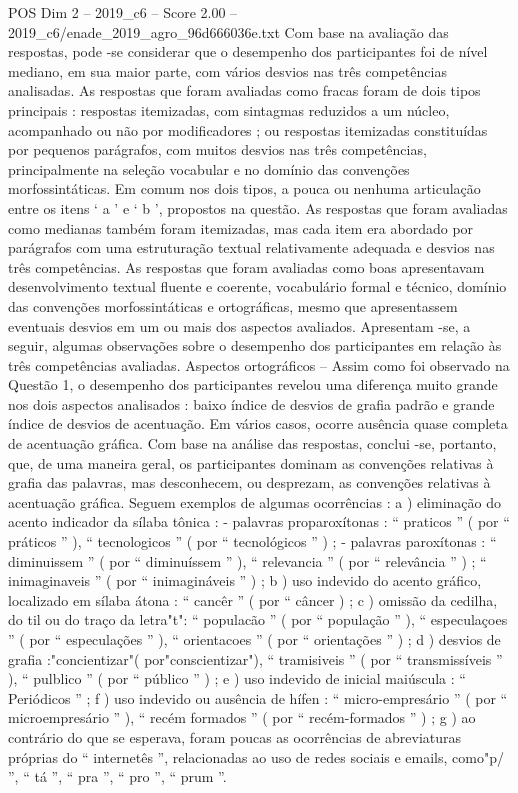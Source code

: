 \begin{textsample}{POS Dim 2 – 2019\_c6 – Score 2.00 – 2019\_c6/enade\_2019\_agro\_96d666036e.txt}
Com base na avaliação das respostas, pode -se considerar que o desempenho dos participantes foi de nível mediano, em sua maior parte, com vários desvios nas três competências analisadas.
As respostas que foram avaliadas como fracas foram de dois tipos principais : respostas itemizadas, com sintagmas reduzidos a um núcleo, acompanhado ou não por modificadores ; ou respostas itemizadas constituídas por pequenos parágrafos, com muitos desvios nas três competências, principalmente na seleção vocabular e no domínio das convenções morfossintáticas.
Em comum nos dois tipos, a pouca ou nenhuma articulação entre os itens ‘ a ’ e ‘ b ’, propostos na questão.
As respostas que foram avaliadas como medianas também foram itemizadas, mas cada item era abordado por parágrafos com uma estruturação textual relativamente adequada e desvios nas três competências.
As respostas que foram avaliadas como boas apresentavam desenvolvimento textual fluente e coerente, vocabulário formal e técnico, domínio das convenções morfossintáticas e ortográficas, mesmo que apresentassem eventuais desvios em um ou mais dos aspectos avaliados.
Apresentam -se, a seguir, algumas observações sobre o desempenho dos participantes em relação às três competências avaliadas.
Aspectos ortográficos – Assim como foi observado na Questão 1, o desempenho dos participantes revelou uma diferença muito grande nos dois aspectos analisados : baixo índice de desvios de grafia padrão e grande índice de desvios de acentuação.
Em vários casos, ocorre ausência quase completa de acentuação gráfica.
Com base na análise das respostas, conclui -se, portanto, que, de uma maneira geral, os participantes dominam as convenções relativas à grafia das palavras, mas desconhecem, ou desprezam, as convenções relativas à acentuação gráfica.
Seguem exemplos de algumas ocorrências : a ) eliminação do acento indicador da sílaba tônica : - palavras proparoxítonas : “ praticos ” ( por “ práticos ” ), “ tecnologicos ” ( por “ tecnológicos ” ) ; - palavras paroxítonas : “ diminuissem ” ( por “ diminuíssem ” ), “ relevancia ” ( por “ relevância ” ) ; “ inimaginaveis ” ( por “ inimagináveis ” ) ; b ) uso indevido do acento gráfico, localizado em sílaba átona : “ cancêr ” ( por “ câncer ) ; c ) omissão da cedilha, do til ou do traço da letra"t": “ populacão ” ( por “ população ” ), “ especulaçoes ” ( por “ especulações ” ), “ orientacoes ” ( por “ orientações ” ) ; d ) desvios de grafia :"concientizar"( por"conscientizar"), “ tramisiveis ” ( por “ transmissíveis ” ), “ pulblico ” ( por “ público ” ) ; e ) uso indevido de inicial maiúscula : “ Periódicos ” ; f ) uso indevido ou ausência de hífen : “ micro-empresário ” ( por “ microempresário ” ), “ recém formados ” ( por “ recém-formados ” ) ; g ) ao contrário do que se esperava, foram poucas as ocorrências de abreviaturas próprias do “ internetês ”, relacionadas ao uso de redes sociais e emails, como"p/ ”, “ tá ”, “ pra ”, “ pro ”, “ prum ”.

\end{textsample}
